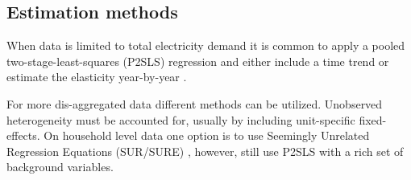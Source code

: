\subsection{Estimation methods}
\label{subsec:b_estimation}
When data is limited to total electricity demand it is common to apply a pooled two-stage-least-squares (P2SLS) regression and either include a time trend \citep{lijesen2007real} or estimate the elasticity year-by-year \citep{bonte2015price}.
\par
For more dis-aggregated data different methods can be utilized. Unobserved heterogeneity must be accounted for, usually by including unit-specific fixed-effects. On household level data one option is to use Seemingly Unrelated Regression Equations (SUR/SURE) \citep{vesterberg2014residential}, however, \citet{alberini2019response} still use P2SLS with a rich set of background variables.

